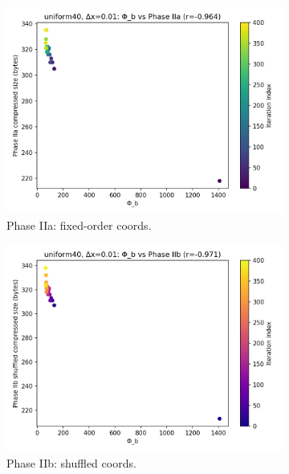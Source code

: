 \documentclass[11pt,a4paper]{article}
\numberwithin{equation}{section}
\begin{document}
\begin{figure}[h!]
\centering
\begin{subfigure}[b]{0.32\textwidth}
\includegraphics[width=\textwidth]{figures/uniform40_dx0.01_phib_vs_phase2a.png}
\caption{Phase IIa: fixed-order coords.}
\end{subfigure}\hfill
\begin{subfigure}[b]{0.32\textwidth}
\includegraphics[width=\textwidth]{figures/uniform40_dx0.01_phib_vs_phase2b.png}
\caption{Phase IIb: shuffled coords.}
\end{subfigure}\hfill
\begin{subfigure}[b]{0.32\textwidth}

\end{subfigure}
\end{figure}
\end{document}
